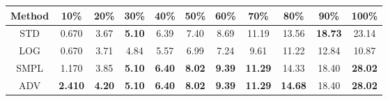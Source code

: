 \documentclass{standalone}
\begin{document}
\begin{tabular}{c|cccccccccc}
      \toprule
      Method & 10\% & 20\% & 30\% & 40\% & 50\% & 60\% & 70\% & 80\% & 90\% & 100\% \\
      \midrule
STD & 0.670 & 3.67 & \textbf{5.10} & 6.39 & 7.40 & 8.69 & 11.19 & 13.56 & \textbf{18.73} & 23.14\\
LOG & 0.670 & 3.71 & 4.84 & 5.57 & 6.99 & 7.24 & 9.61 & 11.22 & 12.84 & 10.87\\
SMPL & 1.170 & 3.85 & \textbf{5.10} & \textbf{6.40} & \textbf{8.02} & \textbf{9.39} & \textbf{11.29} & 14.33 & 18.40 & \textbf{28.02}\\
ADV & \textbf{2.410} & \textbf{4.20} & \textbf{5.10} & \textbf{6.40} & \textbf{8.02} & \textbf{9.39} & \textbf{11.29} & \textbf{14.68} & 18.40 & \textbf{28.02}\\
  \bottomrule
\end{tabular}
\end{document}
